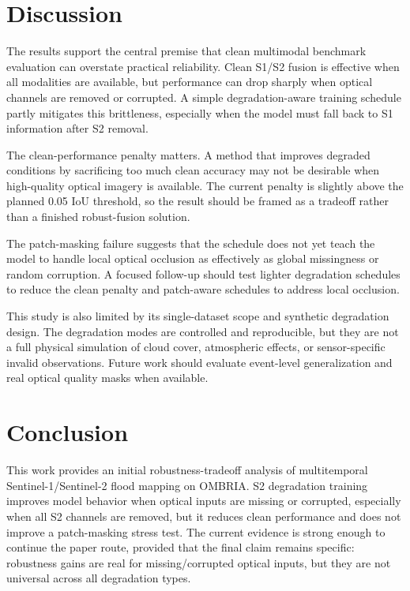 \documentclass[review]{elsarticle}
\begin{document}
\section{Discussion}

The results support the central premise that clean multimodal benchmark
evaluation can overstate practical reliability. Clean S1/S2 fusion is effective
when all modalities are available, but performance can drop sharply when optical
channels are removed or corrupted. A simple degradation-aware training schedule
partly mitigates this brittleness, especially when the model must fall back to
S1 information after S2 removal.

The clean-performance penalty matters. A method that improves degraded
conditions by sacrificing too much clean accuracy may not be desirable when
high-quality optical imagery is available. The current penalty is slightly above
the planned 0.05 IoU threshold, so the result should be framed as a tradeoff
rather than a finished robust-fusion solution.

The patch-masking failure suggests that the schedule does not yet teach the
model to handle local optical occlusion as effectively as global missingness or
random corruption. A focused follow-up should test lighter degradation schedules
to reduce the clean penalty and patch-aware schedules to address local
occlusion.

This study is also limited by its single-dataset scope and synthetic
degradation design. The degradation modes are controlled and reproducible, but
they are not a full physical simulation of cloud cover, atmospheric effects, or
sensor-specific invalid observations. Future work should evaluate event-level
generalization and real optical quality masks when available.

\section{Conclusion}

This work provides an initial robustness-tradeoff analysis of multitemporal
Sentinel-1/Sentinel-2 flood mapping on OMBRIA. S2 degradation training improves
model behavior when optical inputs are missing or corrupted, especially when all
S2 channels are removed, but it reduces clean performance and does not improve a
patch-masking stress test. The current evidence is strong enough to continue the
paper route, provided that the final claim remains specific: robustness gains
are real for missing/corrupted optical inputs, but they are not universal across
all degradation types.



\end{document}
